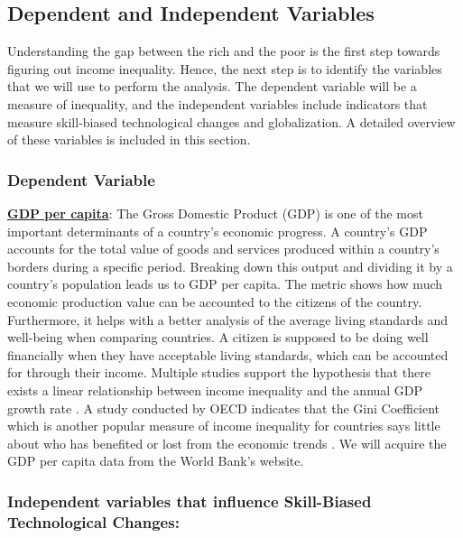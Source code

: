 \documentclass[12pt,oneside]{book} %
\begin{document}
\subsection{Dependent and Independent Variables}

\hspace{20pt}Understanding the gap between the rich and the poor is the first step towards figuring out income inequality. Hence, the next step is to identify the variables that we will use to perform the analysis. The dependent variable will be a measure of inequality, and the independent variables include indicators that measure skill-biased technological changes and globalization. A detailed overview of these variables is included in this section.

\subsubsection{Dependent Variable}

\underline{\textbf{GDP per capita}}: The Gross Domestic Product (GDP) is one of the most important determinants of a country's economic progress. A country's GDP accounts for the total value of goods and services produced within a country's borders during a specific period. Breaking down this output and dividing it by a country's population leads us to GDP per capita. The metric shows how much economic production value can be accounted to the citizens of the country. Furthermore, it helps with a better analysis of the average living standards and well-being when comparing countries. A citizen is supposed to be doing well financially when they have acceptable living standards, which can be accounted for through their income. Multiple studies support the hypothesis that there exists a linear relationship between income inequality and the annual GDP growth rate \cite{luan2017relationship}. A study conducted by OECD indicates that the Gini Coefficient which is another popular measure of income inequality for countries says little about who has benefited or lost from the economic trends \cite{causa_serres_ruiz_2014}. We will acquire the GDP per capita data from the World Bank's website.

\subsubsection{Independent variables that influence Skill-Biased Technological Changes:}
\end{document}

